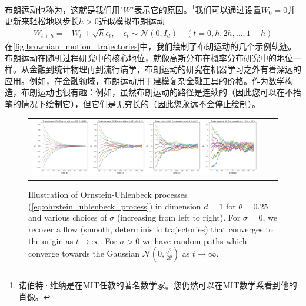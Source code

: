 布朗运动也称为，这就是我们用"$W$"表示它的原因。\footnote{诺伯特·维纳是在MIT任教的著名数学家。您仍然可以在MIT数学系看到他的肖像。}我们可以通过设置$W_0=0$并更新来轻松地以步长$h>0$近似模拟布朗运动
\begin{align}
    W_{t+h} =& W_{t} + \sqrt{h}\epsilon_t,\quad \epsilon_t\sim\mathcal{N}(0,I_d)\quad (t=0,h,2h,\dots,1-h)
\end{align}
在\cref{fig:brownian_motion_trajectories}中，我们绘制了布朗运动的几个示例轨迹。布朗运动在随机过程研究中的核心地位，就像高斯分布在概率分布研究中的地位一样。从金融到统计物理再到流行病学，布朗运动的研究在机器学习之外有着深远的应用。例如，在金融领域，布朗运动用于建模复杂金融工具的价格。作为数学构造，布朗运动也很有趣：例如，虽然布朗运动的路径是连续的（因此您可以在不抬笔的情况下绘制它），但它们是无穷长的（因此您永远不会停止绘制）。

\begin{figure}
    \centering
    \begin{tabular}{ccc}
         \includegraphics[width=\textwidth]{figures/ou_process.png} &
    \end{tabular}
    \caption{\label{fig:bm_ou_process} Illustration of Ornstein-Uhlenbeck processes (\cref{eq:ohrstein_uhlenbeck_process}) in dimension $d=1$ for $\theta=0.25$ and various choices of $\sigma$ (increasing from left to right). For $\sigma=0$, we recover a flow (smooth, deterministic trajectories) that converges to the origin as $t \to \infty$. For $\sigma>0$ we have random paths which converge towards the Gaussian $\mathcal{N}(0,\frac{\sigma^2}{2\theta})$ as $t\to\infty$.}
\end{figure} 


